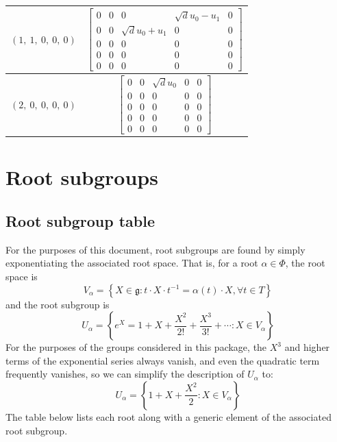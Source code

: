 \documentclass[11pt]{article}
\newcommand{\noi}{\noindent}
\newcommand{\inv}{^{-1}}
\newcommand{\lb}{\left\{}
\newcommand{\rb}{\right\}}
\newcommand{\frakg}{\mathfrak{g}}
\theoremstyle{definition}
\begin{document}
\begin{longtable}{|l|c|}
    \hline
    $\left( 1, \  1, \  0, \  0, \  0\right)$ & ${\left[\begin{matrix}0 & 0 & 0 & \sqrt{d} u_{0} - u_{1} & 0\\0 & 0 & \sqrt{d} u_{0} + u_{1} & 0 & 0\\0 & 0 & 0 & 0 & 0\\0 & 0 & 0 & 0 & 0\\0 & 0 & 0 & 0 & 0\end{matrix}\right]}$ \\
    \hline
    $\left( 2, \  0, \  0, \  0, \  0\right)$ & ${\left[\begin{matrix}0 & 0 & \sqrt{d} u_{0} & 0 & 0\\0 & 0 & 0 & 0 & 0\\0 & 0 & 0 & 0 & 0\\0 & 0 & 0 & 0 & 0\\0 & 0 & 0 & 0 & 0\end{matrix}\right]}$ \\
    \hline
\end{longtable}


\newpage
\section{Root subgroups}

\subsection{Root subgroup table}

\noi For the purposes of this document, root subgroups are found by simply exponentiating the associated root space. That is, for a root $\alpha \in \Phi$, the root space is
\[
	V_\alpha = \lb X \in \frakg : t \cdot X \cdot t \inv = \alpha(t) \cdot X, \forall t \in T \rb
\]
and the root subgroup is
\[
	U_\alpha = \lb e^X = 1 + X + \frac{X^2}{2!} + \frac{X^3}{3!} + \cdots : X \in V_\alpha \rb
\]
For the purposes of the groups considered in this package, the $X^3$ and higher terms of the exponential series always vanish, and even the quadratic term frequently vanishes, so we can simplify the description of $U_\alpha$ to:
\[
	U_\alpha = \lb 1 + X + \frac{X^2}{2} : X \in V_\alpha \rb
\]
The table below lists each root along with a generic element of the associated root subgroup.
\end{document}
